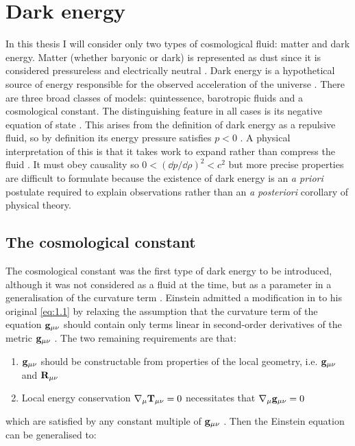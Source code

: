 \section{Dark energy}
\label{sec:1.3}

In this thesis I will consider only two types of cosmological fluid: matter and dark energy. Matter (whether baryonic or dark) is represented as dust since it is considered pressureless and electrically neutral \cite{Barnes2005,Hobson2006,Linder1988a}. Dark energy is a hypothetical source of energy responsible for the observed acceleration of the universe \cite{LinderScherrer2009,Olive2010}. 
There are three broad classes of models: quintessence, barotropic fluids and a cosmological constant. The distinguishing feature in all cases is its negative equation of state \cite{Olive2010}. This arises from the definition of dark energy as a repulsive fluid, so by definition its energy pressure satisfies $p < 0$ \cite{Barnes2005}. A physical interpretation of this is that it takes work to expand rather than compress the fluid \cite{Hobson2006}. It must obey causality so $0 < \left( \dd{p}/\dd{\rho} \right)^{2} < c^2$ \cite{LinderScherrer2009} but more precise properties are difficult to formulate because the existence of dark energy is an \textit{a priori} postulate required to explain observations rather than an \textit{a posteriori} corollary of physical theory.

\subsection{The cosmological constant}
\label{subsec:cosmological-constant}

The cosmological constant was the first type of dark energy to be introduced, although it was not considered as a fluid at the time, but as a parameter in a generalisation of the curvature term \cite{Hobson2006}. Einstein admitted a modification in \cite{Einstein1917} to his original \cref{eq:1.1} by relaxing the assumption that the curvature term of the equation $\mathbf{g}_{\mu\nu}$ should contain only terms linear in second-order derivatives of the metric $\mathbf{g}_{\mu\nu}$ \cite{Hobson2006}. The two remaining requirements are that:
\begin{enumerate}
    \item $\mathbf{g}_{\mu\nu}$ should be constructable from properties of the local geometry, i.e. $\mathbf{g}_{\mu\nu}$ and $\mathbf{R}_{\mu\nu}$
    \item Local energy conservation $\nabla_\mu \mathbf{T}_{\mu\nu} = 0$ necessitates that $\nabla_\mu \mathbf{g}_{\mu\nu} = 0$
\end{enumerate}
which are satisfied by any constant multiple of $\mathbf{g}_{\mu\nu}$ \cite{Hartle2003,Hobson2006}. Then the Einstein equation can be generalised to:

